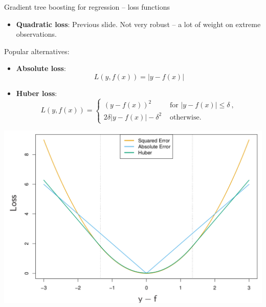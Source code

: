 \documentclass[
  10pt,
  ignorenonframetext,
]{beamer}
\providecommand{\tightlist}{%
  \setlength{\itemsep}{0pt}\setlength{\parskip}{0pt}}
\begin{document}
\begin{frame}
\begin{block}{Gradient tree boosting for regression -- loss functions}
\protect\hypertarget{gradient-tree-boosting-for-regression-loss-functions}{}
\(~\)

\begin{itemize}
\tightlist
\item
  \textbf{Quadratic loss}: Previous slide. Not very robust -- a lot of
  weight on extreme observations.
\end{itemize}

\vspace{8mm}

Popular alternatives:

\vspace{2mm}

\begin{itemize}
\tightlist
\item
  \textbf{Absolute loss}: \[L(y,f(x)) = |y-f(x)| \]
\end{itemize}

\vspace{2mm}

\begin{itemize}
\tightlist
\item
  \textbf{Huber loss}: \[L(y,f(x)) = \begin{cases}
   (y-f(x))^2 &  \text{ for }  |y-f(x)|\leq \delta \ ,\\
  2\delta |y-f(x)| -\delta^2 &  \text{ otherwise.} 
  \end{cases}
  \]
\end{itemize}
\end{block}
\end{frame}

\begin{frame}
\includegraphics{graphics/robust_loss.png}
\end{frame}
\end{document}
